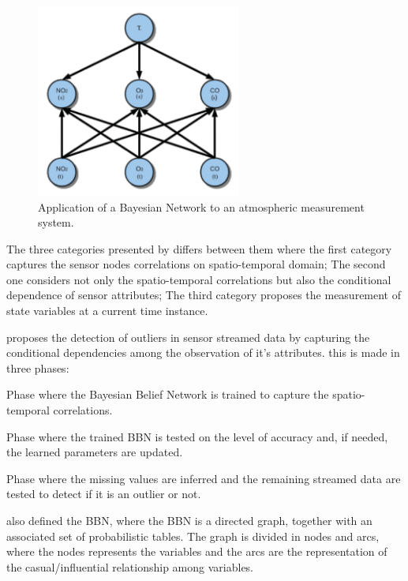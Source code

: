 \begin{figure}[h!]
	\centering
	\includegraphics[width=0.60\textwidth,keepaspectratio]{figures/xiang2016}
	\caption{Application of a Bayesian Network to an atmospheric measurement system. }
	\label{fig:xiang2016}
\end{figure}

The three categories presented by \cite{gen:zhang:2010} differs between them where the first category captures the sensor nodes correlations on spatio-temporal domain; 
The second one considers not only the spatio-temporal correlations but also the conditional dependence of sensor attributes;
The third category proposes the measurement of state variables at a current time instance.

\cite{class:janakiram:2006} proposes the detection of outliers in sensor streamed data by capturing the conditional dependencies among the observation of it's attributes. this is made in three phases:

\begin{description}
	\setlength\itemsep{-0.5em}
	\item[Training Phase]  
	Phase where the Bayesian Belief Network is trained to capture the spatio-temporal correlations.
	\item[Testing Phase]  
	Phase where the trained BBN is tested on the level of accuracy and, if needed, the learned parameters are updated.
	\item[Inference Phase] 
	Phase where the missing values are inferred and the remaining streamed data are tested to detect if it is an outlier or not.
\end{description}

\cite{class:janakiram:2006} also defined the BBN, where the BBN is a directed graph, together with an associated set of probabilistic tables.
The graph is divided in nodes and arcs, where the nodes represents the variables and the arcs are the representation of the casual/influential relationship among variables.

